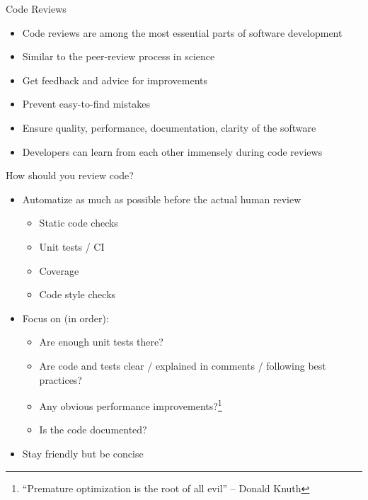 \begin{frame}[c]{Code Reviews}
  \begin{itemize}
    \item Code reviews are among the most essential parts of software development
    \item Similar to the peer-review process in science
    \item Get feedback and advice for improvements
    \item Prevent easy-to-find mistakes
    \item Ensure quality, performance, documentation, clarity of the software
    \item Developers can learn from each other immensely during code reviews
  \end{itemize}
\end{frame}

\begin{frame}[c]{How should you review code?}
  \begin{itemize}
    \item Automatize as much as possible before the actual human review
      \begin{itemize}
        \item Static code checks
        \item Unit tests / CI
        \item Coverage
        \item Code style checks
      \end{itemize}
    \item Focus on (in order):
      \begin{itemize}
        \item[\color{positive}\faCheckSquare] Are enough unit tests there?
        \item[\color{positive}\faCheckSquare] Are code and tests clear / explained in comments / following best practices?
        \item[\color{positive}\faCheckSquare] Any obvious performance improvements?\footnote{\enquote{Premature optimization is the root of all evil} –  Donald Knuth}
        \item[\color{positive}\faCheckSquare] Is the code documented?
      \end{itemize}
    \item Stay friendly but be concise
  \end{itemize}
\end{frame}


